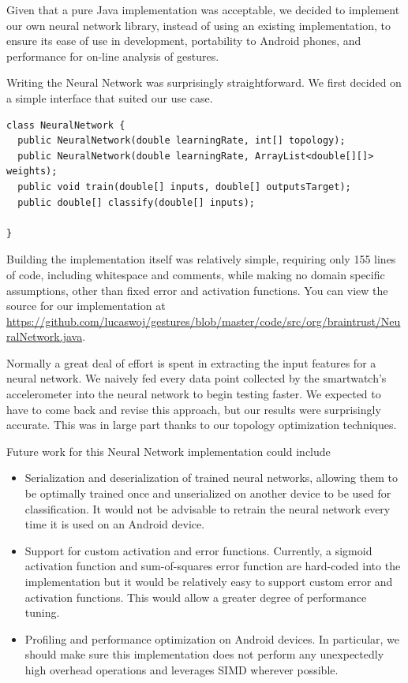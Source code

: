 \documentclass{report}
\begin{document}
Given that a pure Java implementation was acceptable, we decided to implement our own neural network library, instead of using an existing implementation, to ensure its ease of use in development, portability to Android phones, and performance for on-line analysis of gestures.

Writing the Neural Network was surprisingly straightforward. We first decided on a simple interface that suited our use case.
\begin{verbatim}
class NeuralNetwork {
  public NeuralNetwork(double learningRate, int[] topology);
  public NeuralNetwork(double learningRate, ArrayList<double[][]> weights);
  public void train(double[] inputs, double[] outputsTarget);
  public double[] classify(double[] inputs);

}
\end{verbatim}
Building the implementation itself was relatively simple, requiring only 155 lines of code, including whitespace and comments, while making no domain specific assumptions, other than fixed error and activation functions. You can view the source for our implementation at \url{https://github.com/lucaswoj/gestures/blob/master/code/src/org/braintrust/NeuralNetwork.java}.

Normally a great deal of effort is spent in extracting the input features for a neural network. We naively fed every data point collected by the smartwatch's accelerometer into the neural network to begin testing faster. We expected to have to come back and revise this approach, but our results were surprisingly accurate. This was in large part thanks to our topology optimization techniques.

Future work for this Neural Network implementation could include
\begin{itemize}
\item Serialization and deserialization of trained neural networks, allowing them to be optimally trained once and unserialized on another device to be used for classification. It would not be advisable to retrain the neural network every time it is used on an Android device.
\item Support for custom activation and error functions. Currently, a sigmoid activation function and sum-of-squares error function are hard-coded into the implementation but it would be relatively easy to support custom error and activation functions. This would allow a greater degree of performance tuning.
\item Profiling and performance optimization on Android devices. In particular, we should make sure this implementation does not perform any unexpectedly high overhead operations and leverages SIMD wherever possible.
\end{itemize}
\end{document}
